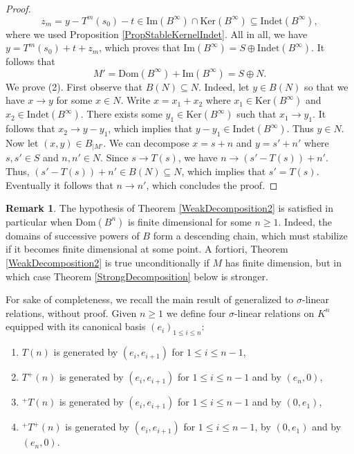 \documentclass[12pt]{amsart}
\theoremstyle{definition}
\newtheorem{remark}[theorem]{Remark}
\newcommand{\<}{\langle}   %
\renewcommand{\>}{\rangle} %
\begin{document}
\begin{proof}
\begin{equation*}
    z_m = y - T^m(s_0) - t \in \mathrm{Im}(B^{\infty}) \cap \mathrm{Ker}(B^{\infty}) \subseteq  \mathrm{Indet}(B^{\infty}),
\end{equation*}
where we used Proposition \ref{PropStableKernelIndet}. All in all, we have $y = T^m(s_0) + t + z_m$, which proves that $\mathrm{Im}(B^{\infty}) = S\oplus \mathrm{Indet}(B^{\infty})$. It follows that 
\begin{equation*}
    M' = \mathrm{Dom}(B^{\infty}) + \mathrm{Im}(B^{\infty}) = S \oplus N.
\end{equation*}
We prove (2). First observe that $B(N) \subseteq  N$. Indeed, let $y \in B(N)$ so that we have $x \to y$ for some $x \in N$. Write $x=x_1 + x_2$ where $x_1 \in \mathrm{Ker}(B^{\infty})$ and $x_2 \in \mathrm{Indet}(B^{\infty})$. There exists some $y_1 \in \mathrm{Ker}(B^{\infty})$ such that $x_1 \to y_1$. It follows that $x_2 \to y - y_1$, which implies that $y-y_1 \in \mathrm{Indet}(B^{\infty})$. Thus $y \in N$.\\
Now let $(x,y) \in B_{|M'}$. We can decompose $x = s + n$ and $y = s' + n'$ where $s,s' \in S$ and $n,n' \in N$. Since $s \to T(s)$, we have $n \to (s'-T(s)) + n'$. Thus, $(s'-T(s)) + n' \in B(N) \subseteq  N$, which implies that $s' = T(s)$. Eventually it follows that $n\to n'$, which concludes the proof. 
\end{proof}

\begin{remark}
    The hypothesis of Theorem \ref{WeakDecomposition2} is satisfied in particular when $\mathrm{Dom}(B^n)$ is finite dimensional for some $n\geq 1$. Indeed, the domains of successive powers of $B$ form a descending chain, which must stabilize if it becomes finite dimensional at some point. A fortiori, Theorem \ref{WeakDecomposition2} is true unconditionally if $M$ has finite dimension, but in which case Theorem \ref{StrongDecomposition} below is stronger.
\end{remark}

For sake of completeness, we recall the main result of \cite{towber:1971} generalized to $\sigma$-linear relations, without proof. Given $n\geq 1$ we define four $\sigma$-linear relations on $K^n$ equipped with its canonical basis $(e_i)_{1\leq i \leq n}$:
\begin{enumerate}
    \item $T(n)$ is generated by $(e_i,e_{i+1})$ for $1 \leq i \leq n-1$,
    \item $T^+(n)$ is generated by $(e_i,e_{i+1})$ for $1 \leq i \leq n-1$ and by $(e_n,0)$,
    \item ${}^+T(n)$ is generated by $(e_i,e_{i+1})$ for $1 \leq i \leq n-1$ and by $(0,e_1)$,
    \item ${}^+T^+(n)$ is generated by $(e_i,e_{i+1})$ for $1 \leq i \leq n-1$, by $(0,e_1)$ and by $(e_n,0)$.
\end{enumerate}
\end{document}

